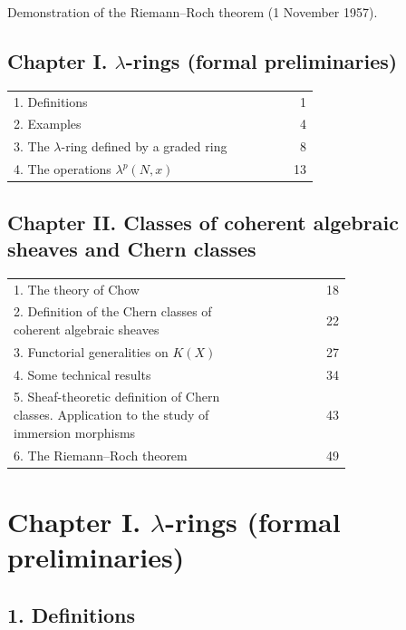 \begin{center}
Demonstration of the Riemann--Roch theorem (1 November 1957).
\end{center}

\subsection*{Chapter I. $\lambda$-rings (formal preliminaries)}
\begin{longtable}{@{}p{0.74\linewidth}r@{}}
1. Definitions & 1\\
2. Examples & 4\\
3. The $\lambda$-ring defined by a graded ring & 8\\
4. The operations $\lambda^p(N,x)$ & 13\\
\end{longtable}

\subsection*{Chapter II. Classes of coherent algebraic sheaves and Chern classes}
\begin{longtable}{@{}p{0.74\linewidth}r@{}}
1. The theory of Chow & 18\\
2. Definition of the Chern classes of coherent algebraic sheaves & 22\\
3. Functorial generalities on $K(X)$ & 27\\
4. Some technical results & 34\\
5. Sheaf-theoretic definition of Chern classes. Application to the study of immersion morphisms & 43\\
6. The Riemann--Roch theorem & 49
\end{longtable}

\section*{Chapter I. $\lambda$-rings (formal preliminaries)}

\subsection*{1. Definitions}

